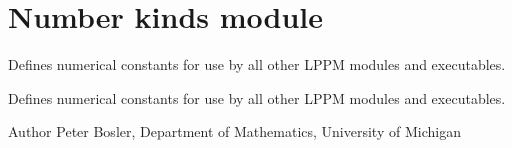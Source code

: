 \hypertarget{group__NumberKinds}{\section{Number kinds module}
\label{group__NumberKinds}
}


Defines numerical constants for use by all other L\+P\+P\+M modules and executables.  


Defines numerical constants for use by all other L\+P\+P\+M modules and executables. 

\begin{DoxyAuthor}{Author}
Peter Bosler, Department of Mathematics, University of Michigan 
\end{DoxyAuthor}
